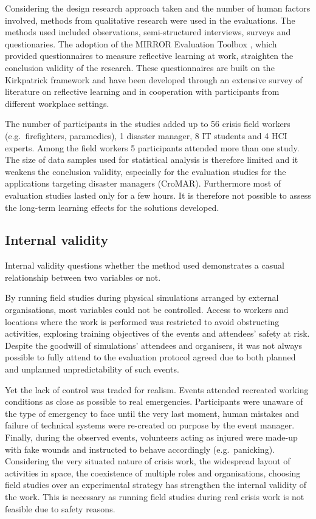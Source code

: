 Considering the design research approach taken and the number of human factors involved, methods from qualitative research were used in the evaluations. The methods used included observations, semi-structured interviews, surveys and questionaries. The adoption of the MIRROR Evaluation Toolbox \autocite{Renner:v4nLmwOk}, which provided questionnaires to measure reflective learning at work, straighten the conclusion validity of the research. These questionnaires are built on the Kirkpatrick framework \autocite{kirkpatrick2009evaluating} and have been developed through an extensive survey of literature on reflective learning and in cooperation with participants from different workplace settings.

The number of participants in the studies added up to 56 crisis field workers (e.g.~firefighters, paramedics), 1 disaster manager, 8 IT students and 4 HCI experts. Among the field workers 5 participants attended more than one study. The size of data samples used for statistical analysis is therefore limited and it weakens the conclusion validity, especially for the evaluation studies for the applications targeting disaster managers (CroMAR). Furthermore most of evaluation studies lasted only for a few hours. It is therefore not possible to assess the long-term learning effects for the solutions developed.

\subsection{Internal validity}\label{internal-validity}

Internal validity questions whether the method used demonstrates a casual relationship between two variables or not.

By running field studies during physical simulations arranged by external organisations, most variables could not be controlled. Access to workers and locations where the work is performed was restricted to avoid obstructing activities, explosing training objectives of the events and attendees' safety at risk. Despite the goodwill of simulations' attendees and organisers, it was not always possible to fully attend to the evaluation protocol agreed due to both planned and unplanned unpredictability of such events.

Yet the lack of control was traded for realism. Events attended recreated working conditions as close as possible to real emergencies. Participants were unaware of the type of emergency to face until the very last moment, human mistakes and failure of technical systems were re-created on purpose by the event manager. Finally, during the observed events, volunteers acting as injured were made-up with fake wounds and instructed to behave accordingly (e.g.~panicking). Considering the very situated nature of crisis work, the widespread layout of activities in space, the coexistence of multiple roles and organisations, choosing field studies over an experimental strategy has strengthen the internal validity of the work. This is necessary as running field studies during real crisis work is not feasible due to safety reasons.

